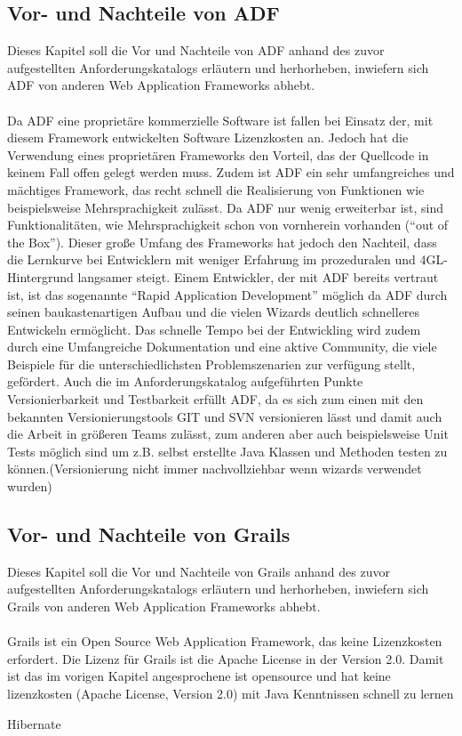 \subsection{Vor- und Nachteile von ADF}
Dieses Kapitel soll die Vor und Nachteile von ADF anhand des zuvor aufgestellten Anforderungskatalogs erläutern und herhorheben, inwiefern sich ADF von anderen Web Application Frameworks abhebt.\\\\
Da ADF eine proprietäre kommerzielle Software ist fallen bei Einsatz der, mit diesem Framework entwickelten Software Lizenzkosten an. Jedoch hat die Verwendung eines proprietären Frameworks den Vorteil, das der Quellcode in keinem Fall offen gelegt werden muss. Zudem ist ADF ein sehr umfangreiches und mächtiges Framework, das recht schnell die Realisierung von Funktionen wie beispielsweise Mehrsprachigkeit zulässt. Da ADF nur wenig erweiterbar ist, sind Funktionalitäten, wie Mehrsprachigkeit schon von vornherein vorhanden ("`out of the Box"'). Dieser große Umfang des Frameworks hat jedoch den Nachteil, dass die Lernkurve bei Entwicklern mit weniger Erfahrung im prozeduralen und 4GL-Hintergrund langsamer steigt. Einem Entwickler, der mit ADF bereits vertraut ist, ist das sogenannte "`Rapid Application Development"' möglich da ADF durch seinen baukastenartigen Aufbau und die vielen Wizards deutlich schnelleres Entwickeln ermöglicht. Das schnelle Tempo bei der Entwickling wird zudem durch eine Umfangreiche Dokumentation und eine aktive Community, die viele Beispiele für die unterschiedlichsten Problemszenarien zur verfügung stellt, gefördert.
Auch die im Anforderungskatalog aufgeführten Punkte Versionierbarkeit und Testbarkeit erfüllt ADF, da es sich zum einen mit den bekannten Versionierungstools GIT und SVN versionieren lässt und damit auch die Arbeit in größeren Teams zulässt, zum anderen aber auch beispielsweise Unit Tests möglich sind um z.B. selbst erstellte Java Klassen und Methoden testen zu können.(Versionierung nicht immer nachvollziehbar wenn wizards verwendet wurden)
\subsection{Vor- und Nachteile von Grails}
Dieses Kapitel soll die Vor und Nachteile von Grails anhand des zuvor aufgestellten Anforderungskatalogs erläutern und herhorheben, inwiefern sich Grails von anderen Web Application Frameworks abhebt.\\\\
Grails ist ein Open Source Web Application Framework, das keine Lizenzkosten erfordert. Die Lizenz für Grails ist die Apache License in der Version 2.0. Damit ist das im vorigen Kapitel angesprochene
ist opensource und hat keine lizenzkosten (Apache License, Version 2.0)
mit Java Kenntnissen schnell zu lernen

Hibernate

